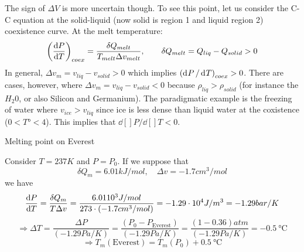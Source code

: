 \documentclass[../main/main.tex]{subfiles}
\begin{document}
The sign of \( \Delta V \) is more uncertain though. To see this point, let us consider the C-C equation at the solid-liquid (now solid is region 1 and liquid region 2) coexistence curve.
At the melt temperature:
\begin{equation*}
  \qty(\dv{P}{T} )_{coex} = \frac{\delta Q_{melt}}{T_{melt}\Delta v_{melt}}, \qquad \delta Q_{melt} = Q_{liq} - Q_{solid} > 0
  \label{eq:}
\end{equation*}
In general, \( \Delta v_m = v_{liq} - v_{solid} > 0 \) which implies \( \qty( \dd[]{P}/\dd[]{T}   )_{coex} > 0  \). There are cases, however, where \( \Delta v_m = v_{liq} - v_{solid} < 0 \) because \( \rho_{liq} > \rho _{solid} \) (for instance the \( H_2 0 \), or also Silicon and Germanium). The paradigmatic example is the freezing of water where \( v_{ice} > v_{liq} \) since ice is less dense than liquid water at the coxistence (\( 0 < T° < 4 \)). This implies that \( \dd[]{P}/\dd[]{T} < 0   \).

\begin{example}{Melting point on Everest}{}

Consider \( T = 237 K \) and \( P=P_0 \). If we suppose that
\begin{equation*}
\delta Q_m = 6.01 kJ/mol, \quad \Delta v = -1.7 cm^3 /mol    
\end{equation*}
we have
\begin{equation*}
  \dv{P}{T}  = \frac{\delta Q_m}{T \Delta v} = \frac{6.01 10^3 J/mol}{273 \cdot (-1.7 cm^3/mol)} = -1.29 \cdot 10^4 J/m^3 = -1.29 bar/K
  \label{eq:}
\end{equation*}
\begin{equation*}
  \Rightarrow \Delta T = \frac{\Delta P}{(-1.29 Pa/K)} = \frac{(P_0 - P_{\text{Everest}})}{(-1.29 Pa/K)} = \frac{(1-0.36)atm}{(-1.29 Pa/K)} = -0.5\SI{}{\celsius}
  \label{eq:}
\end{equation*}
\begin{equation*}
  \Rightarrow T_m ( \text{Everest}) = T_m (P_0) + 0.5\SI{}{\celsius}
  \label{eq:}
\end{equation*}
\end{example}
\end{document}
